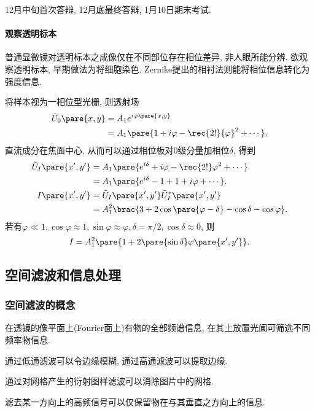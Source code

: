 \documentclass{ctexart}
\begin{document}
12月中旬首次答辩, 12月底最终答辩, 1月10日期末考试.


\paragraph{观察透明标本} %
\label{par:观察透明标本}

普通显微镜对透明标本之成像仅在不同部位存在相位差异, 非人眼所能分辨. 欲观察透明标本, 早期做法为将细胞染色. Zernike提出的相衬法则能将相位信息转化为强度信息.

\par
将样本视为一相位型光栅, 则透射场
\begin{align*}
    \tilde{U}_0\pare{x,y} &= A_1 e^{i\varphi\pare{x,y}} \\
    &= A_1 \pare{1+i\varphi - \rec{2!}{\varphi}^{2} + \cdots}.
\end{align*}
直流成分在焦面中心, 从而可以通过相位板对$0$级分量加相位$\delta$, 得到
\begin{align*}
    \tilde{U}_I\pare{x',y'} &= A_1\pare{e^{i\delta} + i\varphi - \rec{2!}\varphi^2 + \cdots} \\
    &= A_1\pare{e^{i\delta} - 1 + 1 + i\varphi + \cdots}. \\
    I\pare{x',y'} &= \tilde{U}_I\pare{x',y'}\tilde{U}_I^*\pare{x',y'} \\
    &= A_1^2 \brac{3 + 2\cos\pare{\varphi - \delta} - \cos\delta - \cos\varphi}.
\end{align*}
若有$\varphi \ll 1, \cos\varphi\approx 1, \sin\varphi\approx\varphi, \delta=\pi/2, \cos\delta \approx 0$, 则
\[ I = A_1^2 \pare{1+2\pare{\sin\delta} \varphi\pare{x',y'}}. \]



\subsection{空间滤波和信息处理} %
\label{sub:空间滤波和信息处理}

\subsubsection{空间滤波的概念} %
\label{ssub:空间滤波的概念}

在透镜的像平面上(Fourier面上)有物的全部频谱信息, 在其上放置光阑可筛选不同频率物信息.
\begin{ex}
    通过低通滤波可以令边缘模糊, 通过高通滤波可以提取边缘.
\end{ex}
\begin{ex}
    通过对网格产生的衍射图样滤波可以消除图片中的网格.
\end{ex}
\begin{ex}
    滤去某一方向上的高频信号可以仅保留物在与其垂直之方向上的信息.
\end{ex}
\end{document}
